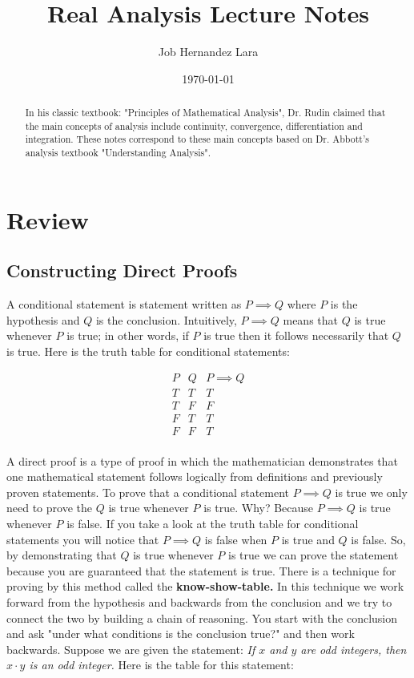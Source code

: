 \documentclass[10pt]{article}
\title{Real Analysis Lecture Notes}
\author{Job Hernandez Lara}
\date{\today}
\begin{document}
\maketitle \tableofcontents 


\begin{abstract}
In his classic textbook: "Principles of Mathematical Analysis", Dr. Rudin claimed that the main concepts of analysis include continuity, convergence, differentiation and integration. These notes correspond to these main concepts based on Dr. Abbott's analysis textbook "Understanding Analysis".
\end{abstract}

\section{Review}

\subsection{Constructing Direct Proofs}
A conditional statement is statement written as $P\implies Q$ where $P$ is the hypothesis and $ Q $ is the conclusion. Intuitively, $P \implies Q$ means that $Q$ is true whenever $P$ is true; in other words, if $P$ is true then it follows necessarily that $Q$ is true. Here is the truth table for conditional statements:

\begin{center}
    \[
\begin{array}{r|c|l} 
P & Q & P \implies Q\\
\hline
T & T & T\\
T & F & F\\
F & T & T\\
F & F & T\\
\end{array}
\]
\end{center}
A direct proof is a type of proof in which the mathematician demonstrates that one mathematical statement follows logically from definitions and previously proven statements. To prove that a conditional statement $P \implies Q$ is true we only need to prove the $Q$ is true whenever $P$ is true. Why? Because $P\implies Q$ is true whenever $P$ is false. If you take a look at the truth table for conditional statements you will notice that $P \implies Q$ is false when $P$ is true and $Q$ is false. So, by demonstrating that $Q$ is true whenever $P$ is true we can prove the statement because you are guaranteed that the statement is true. There is a technique for proving by this method called the \textbf{know-show-table.} In this technique we work forward from the hypothesis and backwards from the conclusion and we try to connect the two by building a chain of reasoning. You start with the conclusion and ask "under what conditions is the conclusion true?" and then work backwards. Suppose  we are given the statement: \textit{If $x$ and $y$ are odd integers, then $x \cdot y$ is an odd integer.} Here is the table for this statement:
\end{document}
